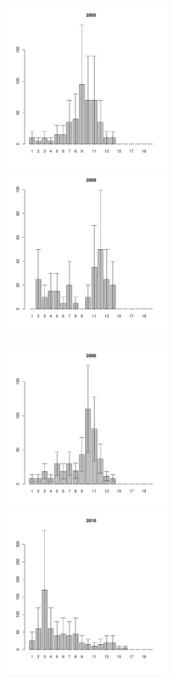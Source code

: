 \documentclass[12pt, a4paper]{article}
\begin{document}
\begin{figure}[h]
\begin{multicols}{3}
\hfill
\includegraphics[width=60mm]{../White_Sea/Luvenga_Goreliy/low_2005_.pdf}
\hfill
\includegraphics[width=60mm]{../White_Sea/Luvenga_Goreliy/low_2009_.pdf}
\end{multicols}


\begin{multicols}{3}
\hfill
\includegraphics[width=60mm]{../White_Sea/Luvenga_Goreliy/low_2006_.pdf}
\hfill
\includegraphics[width=60mm]{../White_Sea/Luvenga_Goreliy/low_2010_.pdf}
\end{multicols}


\end{figure}
\end{document}
